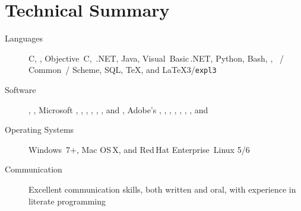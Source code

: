 \documentclass{simplecv}
\begin{document}
\maketitle
\vfill
 \vfill \vfill
\section{Technical Summary}
\begin{minipage}{\textwidth}
\begin{description}
\item[Languages]
  C,
  \CPP,
  Objective~C,
  \CSharp\,.NET,
  Java,
  Visual~Basic\,.NET,
  Python,
  Bash,
  ,
  ~\Lisp\slash
            Common~\Lisp\slash
            Scheme,
  SQL,
  \TeX,
  and
  \LaTeX3\slash\texttt{expl3}

\item[Software]
  ,
  ,
  Microsoft ,
            ,
            ,
            ,
            ,
            ,
            and
            ,
  Adobe's
    ,
    ,
    ,
  ,
  ,
  ,
  ,
  and

\item[Operating Systems]
  Windows~7+,
  Mac OS\,X,
  and
  Red\,Hat Enterprise~Linux 5\slash 6

\item[Communication]
  Excellent communication skills, both written and oral,
    with experience in literate programming
\end{description}
\end{minipage}

\vfill\vfill
\end{document}

